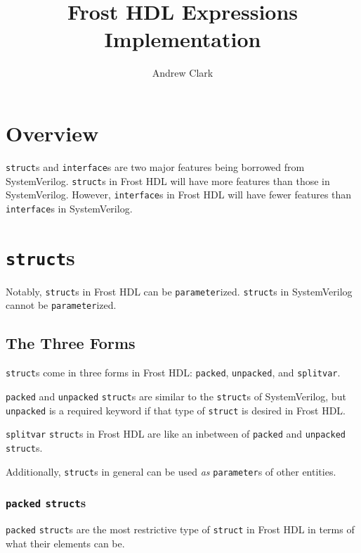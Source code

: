 \documentclass{article}
\title{Frost HDL Expressions Implementation}
\author{Andrew Clark}
\begin{document}
	\maketitle
	\newpage


	\doublespacing

	\section{Overview}
	\texttt{struct}s and \texttt{interface}s are two major features being
	borrowed from SystemVerilog.  \texttt{struct}s in Frost HDL will
	have more features than those in SystemVerilog.  However,
	\texttt{interface}s in Frost HDL will have fewer features than
	\texttt{interface}s in SystemVerilog.


	\section{\texttt{struct}s}
	Notably, \texttt{struct}s in Frost HDL can be \texttt{parameter}ized.
	\texttt{struct}s in SystemVerilog cannot be \texttt{parameter}ized.


	\subsection{The Three Forms}
	\texttt{struct}s come in three forms in Frost HDL:  \texttt{packed},
	\texttt{unpacked}, and \texttt{splitvar}.

	\texttt{packed} and \texttt{unpacked} \texttt{struct}s are similar to
	the \texttt{struct}s of SystemVerilog, but \texttt{unpacked} is a
	required keyword if that type of \texttt{struct} is desired in Frost
	HDL.

	\texttt{splitvar} \texttt{struct}s in Frost HDL are like an inbetween
	of \texttt{packed} and \texttt{unpacked} \texttt{struct}s.

	Additionally, \texttt{struct}s in general can be used \textit{as}
	\texttt{parameter}s of other entities.

	\subsubsection{\texttt{packed} \texttt{struct}s}
	\texttt{packed} \texttt{struct}s are the most restrictive type of
	\texttt{struct} in Frost HDL in terms of what their elements can be.
\end{document}
